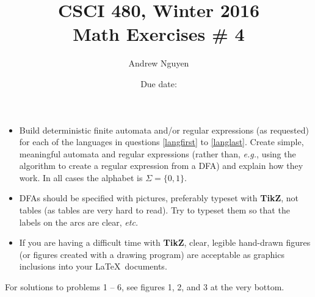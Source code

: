 \documentclass{article}
\title{CSCI 480, Winter 2016\\Math Exercises \# 4}
\author{Andrew Nguyen}
\date{Due date:  }
\begin{document}
\maketitle

\begin{itemize}
  \item
Build deterministic finite automata and/or regular expressions (as
requested) for each of the languages in questions \ref{langfirst} to
\ref{langlast}.  Create simple, meaningful automata and regular
expressions (rather than, {\em e.g.}, using the algorithm to create a
regular expression from a DFA) and explain how they work.  In all
cases the alphabet is $\Sigma = \{0,1\}$.
\item
DFAs should be specified with pictures, preferably
typeset with {\bf TikZ}, not tables
(as tables are very hard to read).  Try to typeset them so that the
labels on the arcs are clear, {\em etc.}
\item
If you are having a difficult time with {\bf TikZ}, clear, legible
hand-drawn figures (or figures created with a drawing program)
are acceptable as graphics inclusions into your \LaTeX\ 
documents. 
\end{itemize}


For solutions to problems 1 – 6, see figures 1, 2, and 3 at the very bottom.
\end{document}
